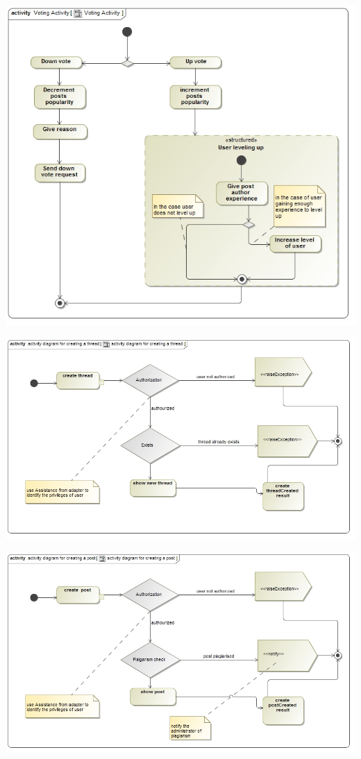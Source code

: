 \documentclass[12pt, oneside]{article}
\begin{document}
		 \includegraphics[scale=0.45]{Activity_Diagram__Voting_Activity__Voting_Activity}
		 \newline
		 
 		\includegraphics[scale=0.45]{createThreadNew}
		 \newline
		 
		 \includegraphics[scale=0.45]{createPostNew}
		 \newline
		 
\end{document}
